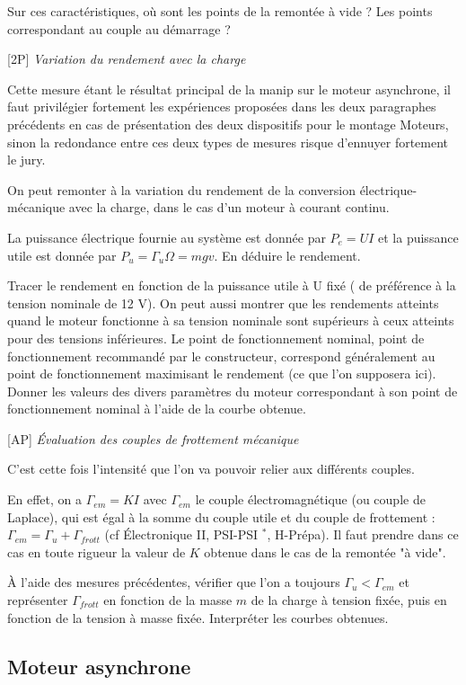 \documentclass{article}%
\begin{document}
Sur ces caractéristiques, où sont les points de la remontée à vide ? Les points correspondant au couple au démarrage ?

[2P] \textit{Variation du rendement avec la charge}

Cette mesure étant le résultat principal de la manip sur le moteur asynchrone, il faut privilégier fortement les expériences proposées dans les deux paragraphes précédents en cas de présentation des deux dispositifs pour le montage Moteurs, sinon la redondance entre ces deux types de mesures risque d'ennuyer fortement le jury.

On peut remonter à la variation du rendement de la conversion électrique-mécanique avec la charge, dans le cas d'un moteur à courant continu.

La puissance électrique fournie au système est donnée par $P_e = UI$ et la puissance utile est donnée par $P_u = \Gamma_u \Omega = m g v$. En déduire le rendement.

Tracer le rendement en fonction de la puissance utile à U fixé ( de préférence à la tension nominale de 12 V). On peut aussi montrer que les rendements atteints quand le moteur fonctionne à sa tension nominale sont supérieurs à ceux atteints pour des tensions inférieures. Le point de fonctionnement nominal, point de fonctionnement recommandé par le constructeur, correspond généralement au point de fonctionnement maximisant le rendement (ce que l'on supposera ici). Donner les valeurs des divers paramètres du moteur correspondant à son point de fonctionnement nominal à l'aide de la courbe obtenue.

[AP] \textit{Évaluation des couples de frottement mécanique}

C'est cette fois l'intensité que l'on va pouvoir relier aux différents couples.

En effet, on a $\Gamma_{em} = K I$ avec $\Gamma_{em}$ le couple électromagnétique (ou couple de Laplace), qui est égal à la somme du couple utile et du couple de frottement : $\Gamma_{em} = \Gamma_u + \Gamma_{frott}$ (cf Électronique II, PSI-PSI $^*$, H-Prépa). Il faut prendre dans ce cas en toute rigueur la valeur de $K$ obtenue dans le cas de la remontée "à vide".

À l'aide des mesures précédentes, vérifier que l'on a toujours $\Gamma_u < \Gamma_{em}$ et représenter $\Gamma_{frott}$ en fonction de la masse $m$ de la charge à tension fixée, puis en fonction de la tension à masse fixée. Interpréter les courbes obtenues. 

\subsection{Moteur asynchrone}
\end{document}
